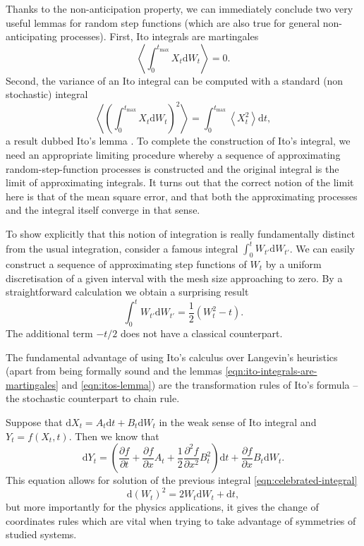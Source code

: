 \documentclass[physics]{doctoral}
\newcommand{\pd}{\partial}
\newcommand{\dd}{\mathrm{d}}
\begin{document}
Thanks to the non-anticipation property, we can immediately conclude two very useful lemmas for random step functions (which are also true for general non-anticipating processes).
First, Ito integrals are martingales
\begin{equation}
    \left< \int_0^{t_{\mathrm{max}}} X_t \dd W_t \right> = 0.
    \label{eqn:ito-integrals-are-martingales}
\end{equation}
Second, the variance of an Ito integral can be computed with a standard (non stochastic) integral
\begin{equation}
    \left< \left( \int_0^{t_{\mathrm{max}}} X_t \dd W_t \right)^2 \right> = \int_{0}^{t_{\mathrm{max}}} \left< X_t^2 \right> \dd t, \label{eqn:itos-lemma}
\end{equation}
a result dubbed Ito's lemma \cite{Ito_1951}.
To complete the construction of Ito's integral, we need an appropriate limiting procedure whereby a sequence of approximating random-step-function processes is constructed and the original integral is the limit of approximating integrals.
It turns out that the correct notion of the limit here is that of the mean square error, and that both the approximating processes and the integral itself converge in that sense.

To show explicitly that this notion of integration is really fundamentally distinct from the usual integration, consider a famous integral $\int_0^t W_{t'} \dd W_{t'}$.
We can easily construct a sequence of approximating step functions of $W_{t}$ by a uniform discretisation of a given interval with the mesh size approaching to zero.
By a straightforward calculation we obtain a surprising result
\begin{equation}
    \int_{0}^{t} W_{t'} \dd W_{t'} = \frac{1}{2} \left( W_t^2 - t \right).
    \label{eqn:celebrated-integral}
\end{equation}
The additional term $-t/2$ does not have a classical counterpart.

The fundamental advantage of using Ito's calculus over Langevin's heuristics (apart from being formally sound and the lemmas \eqref{eqn:ito-integrals-are-martingales} and \eqref{eqn:itos-lemma}) are the transformation rules of Ito's formula -- the stochastic counterpart to chain rule.

Suppose that $\dd X_t = A_t \dd t + B_t \dd W_t$ in the weak sense of Ito integral and $Y_t = f(X_t,t)$.
Then we know that
\begin{equation}
    \dd Y_t = \left( \frac{\pd f}{\pd t} + \frac{\pd f}{\pd x} A_t + \frac{1}{2} \frac{\pd^2 f}{\pd x^2} B_t^2 \right) \dd t + \frac{\pd f}{\pd x} B_t \dd W_t.
    \label{eqn:itos-formula}
\end{equation}
This equation allows for solution of the previous integral \eqref{eqn:celebrated-integral}
\begin{equation}
    \dd (W_t)^2 = 2 W_t \dd W_t + \dd t, \label{eqn:ito-formula-applied}
\end{equation}
but more importantly for the physics applications, it gives the change of coordinates rules which are vital when trying to take advantage of symmetries of studied systems.
\end{document}

